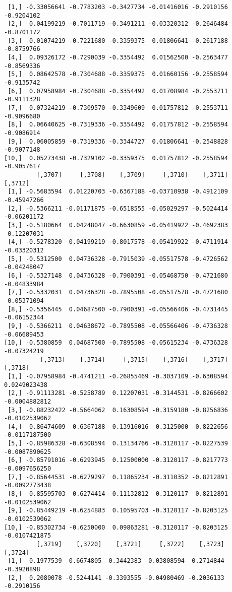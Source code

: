 \documentclass[
  letterpaper,
  DIV=11,
  numbers=noendperiod]{scrreprt}
\begin{document}
\begin{verbatim}
 [1,] -0.33056641 -0.7783203 -0.3427734 -0.01416016 -0.2910156 -0.9204102
 [2,]  0.04199219 -0.7011719 -0.3491211 -0.03320312 -0.2646484 -0.8701172
 [3,] -0.01074219 -0.7221680 -0.3359375  0.01806641 -0.2617188 -0.8759766
 [4,]  0.09326172 -0.7290039 -0.3354492  0.01562500 -0.2563477 -0.8569336
 [5,]  0.08642578 -0.7304688 -0.3359375  0.01660156 -0.2558594 -0.9135742
 [6,]  0.07958984 -0.7304688 -0.3354492  0.01708984 -0.2553711 -0.9111328
 [7,]  0.07324219 -0.7309570 -0.3349609  0.01757812 -0.2553711 -0.9096680
 [8,]  0.06640625 -0.7319336 -0.3354492  0.01757812 -0.2558594 -0.9086914
 [9,]  0.06005859 -0.7319336 -0.3344727  0.01806641 -0.2548828 -0.9077148
[10,]  0.05273438 -0.7329102 -0.3359375  0.01757812 -0.2558594 -0.9057617
         [,3707]     [,3708]    [,3709]     [,3710]    [,3711]     [,3712]
 [1,] -0.5683594  0.01220703 -0.6367188 -0.03710938 -0.4912109 -0.45947266
 [2,] -0.5366211 -0.01171875 -0.6518555 -0.05029297 -0.5024414 -0.06201172
 [3,] -0.5180664  0.04248047 -0.6630859 -0.05419922 -0.4692383 -0.12207031
 [4,] -0.5278320  0.04199219 -0.8017578 -0.05419922 -0.4711914 -0.03320312
 [5,] -0.5312500  0.04736328 -0.7915039 -0.05517578 -0.4726562 -0.04248047
 [6,] -0.5327148  0.04736328 -0.7900391 -0.05468750 -0.4721680 -0.04833984
 [7,] -0.5332031  0.04736328 -0.7895508 -0.05517578 -0.4721680 -0.05371094
 [8,] -0.5356445  0.04687500 -0.7900391 -0.05566406 -0.4731445 -0.06152344
 [9,] -0.5366211  0.04638672 -0.7895508 -0.05566406 -0.4736328 -0.06689453
[10,] -0.5380859  0.04687500 -0.7895508 -0.05615234 -0.4736328 -0.07324219
          [,3713]    [,3714]     [,3715]    [,3716]    [,3717]       [,3718]
 [1,] -0.07958984 -0.4741211 -0.26855469 -0.3037109 -0.6308594  0.0249023438
 [2,] -0.91113281 -0.5258789  0.12207031 -0.3144531 -0.8266602 -0.0004882812
 [3,] -0.88232422 -0.5664062  0.16308594 -0.3159180 -0.8256836 -0.0102539062
 [4,] -0.86474609 -0.6367188  0.13916016 -0.3125000 -0.8222656 -0.0117187500
 [5,] -0.85986328 -0.6308594  0.13134766 -0.3120117 -0.8227539 -0.0087890625
 [6,] -0.85791016 -0.6293945  0.12500000 -0.3120117 -0.8217773 -0.0097656250
 [7,] -0.85644531 -0.6279297  0.11865234 -0.3110352 -0.8212891 -0.0092773438
 [8,] -0.85595703 -0.6274414  0.11132812 -0.3120117 -0.8212891 -0.0102539062
 [9,] -0.85449219 -0.6254883  0.10595703 -0.3120117 -0.8203125 -0.0102539062
[10,] -0.85302734 -0.6250000  0.09863281 -0.3120117 -0.8203125 -0.0107421875
         [,3719]    [,3720]    [,3721]     [,3722]    [,3723]    [,3724]
 [1,] -0.1977539 -0.6674805 -0.3442383 -0.03808594 -0.2714844 -0.3920898
 [2,]  0.2080078 -0.5244141 -0.3393555 -0.04980469 -0.2036133 -0.2910156

\end{verbatim}
\end{document}
